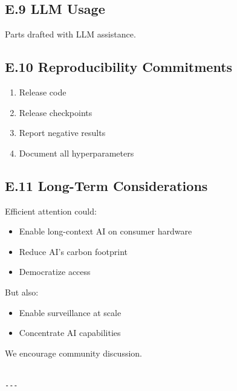 \subsection{E.9 LLM Usage}

Parts drafted with LLM assistance.

\subsection{E.10 Reproducibility Commitments}

\begin{enumerate}
\item Release code
\item Release checkpoints
\item Report negative results
\item Document all hyperparameters

\end{enumerate}
\subsection{E.11 Long-Term Considerations}

Efficient attention could:

\begin{itemize}
\item Enable long-context AI on consumer hardware
\item Reduce AI's carbon footprint
\item Democratize access

\end{itemize}
But also:

\begin{itemize}
\item Enable surveillance at scale
\item Concentrate AI capabilities

\end{itemize}
We encourage community discussion.
\begin{lstlisting}

---
\end{lstlisting}